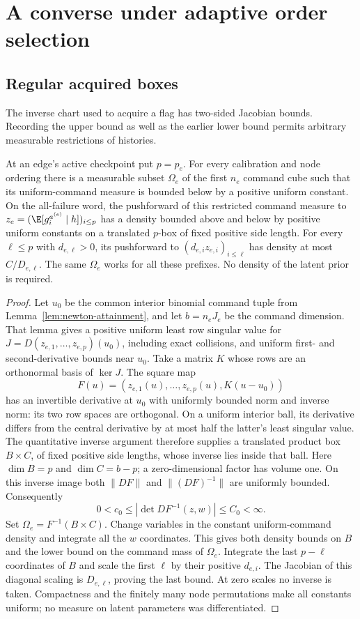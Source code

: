 \section{A converse under adaptive order selection}\label{sec:v25-adaptive-proof}
\subsection{Regular acquired boxes}
The inverse chart used to acquire a flag has two-sided Jacobian bounds.
Recording the upper bound as well as the earlier lower bound permits
arbitrary measurable restrictions of histories.

\begin{lemma}\label{lem:v25-regular-box}
At an edge's active checkpoint put $p=p_e$. For every calibration and
node ordering there is a measurable subset $\Omega_e$ of the first
$n_e$ command cube such that its uniform-command measure is bounded
below by a positive uniform constant. On the all-failure word, the
pushforward of this restricted command measure to
$z_e=(\E[g_i^{a^{(e)}}\mid h])_{i\le p}$ has a density bounded above
and below by positive uniform constants on a translated $p$-box of
fixed positive side length. For every $\ell\le p$ with
$d_{e,\ell}>0$, its pushforward to $(d_{e,i}z_{e,i})_{i\le\ell}$
has density at most $C/D_{e,\ell}$. The same $\Omega_e$ works for all
these prefixes. No density of the latent prior is required.
\end{lemma}
\begin{proof}
Let $u_0$ be the common interior binomial command tuple from
Lemma~\ref{lem:newton-attainment}, and let $b=n_eJ_e$ be the command
dimension. That lemma gives a positive uniform least row singular value
for $J=D(z_{e,1},\ldots,z_{e,p})(u_0)$, including exact collisions,
and uniform first- and second-derivative bounds near $u_0$.
Take a matrix $K$ whose rows are an orthonormal basis of $\ker J$.
The square map
\[
 F(u)=(z_{e,1}(u),\ldots,z_{e,p}(u),K(u-u_0))
\]
has an invertible derivative at $u_0$ with uniformly bounded norm and
inverse norm: its two row spaces are orthogonal. On a uniform interior
ball, its derivative differs from the central derivative by at most
half the latter's least singular value. The quantitative inverse
argument therefore supplies a translated product box $B\times C$,
of fixed positive side lengths, whose inverse lies inside that ball.
Here $\dim B=p$ and $\dim C=b-p$; a zero-dimensional factor has
volume one. On this inverse image both $\|DF\|$ and $\|(DF)^{-1}\|$
are uniformly bounded. Consequently
\[
 0<c_0\le |\det DF^{-1}(z,w)|\le C_0<\infty.
\]
Set $\Omega_e=F^{-1}(B\times C)$. Change variables in the constant
uniform-command density and integrate all the $w$ coordinates. This
gives both density bounds on $B$ and the lower bound on the command
mass of $\Omega_e$. Integrate the last $p-\ell$ coordinates of $B$
and scale the first $\ell$ by their positive $d_{e,i}$. The Jacobian
of this diagonal scaling is $D_{e,\ell}$, proving the last bound.
At zero scales no inverse is taken. Compactness and the finitely many
node permutations make all constants uniform; no measure on latent
parameters was differentiated.
\end{proof}

